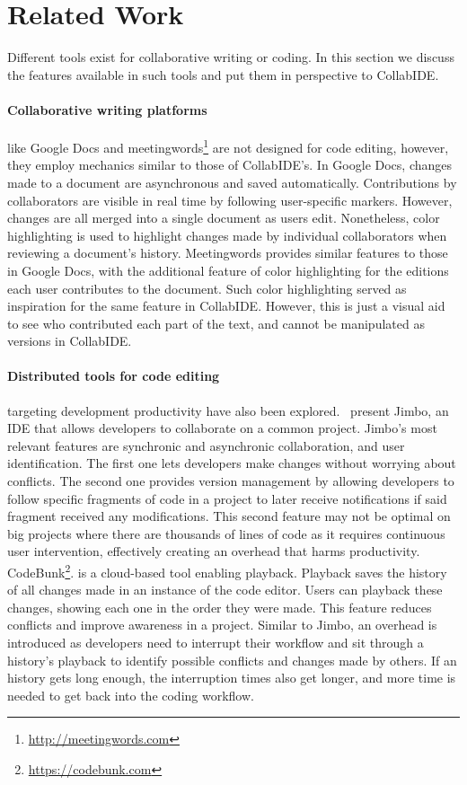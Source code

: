 

\section{Related Work}
\label{sec:related}

Different tools exist for collaborative writing or coding.
In this section we discuss the features available in such tools and put them in perspective to CollabIDE.

\paragraph
{Collaborative writing platforms} like Google Docs and 
meetingwords\footnote{\url{http://meetingwords.com}} are not designed for code editing, 
however, they employ mechanics similar to those of CollabIDE’s. In Google Docs, changes made to a 
document are asynchronous and saved automatically. Contributions by collaborators are visible in real 
time by following user-specific markers. However,  changes are all merged into a single document as 
users edit. Nonetheless, color highlighting is used to highlight changes made by individual collaborators 
when reviewing a document’s history. Meetingwords provides similar features to those in Google Docs, 
with the additional feature of color highlighting for the editions each user contributes to the document. 
Such color highlighting served as inspiration for the same feature in CollabIDE. However, this is just a 
visual aid to see who contributed each part of the text, and cannot be manipulated as versions in 
CollabIDE.

\paragraph
{Distributed tools for code editing} targeting development productivity have also been 
explored.~\citet{ghorashi} present Jimbo, an IDE that allows developers to collaborate on a common 
project. Jimbo's most relevant features are synchronic and asynchronic collaboration, and user 
identification. The first one lets developers make changes without worrying about conflicts. The second 
one provides version management by allowing developers to follow specific fragments of code in a 
project to later receive notifications if said fragment received any modifications. This second feature may 
not be optimal on big projects where there are thousands of lines of code as it requires continuous user 
intervention, effectively creating an overhead that harms productivity. 
CodeBunk\footnote{\url{https://codebunk.com}}. is a cloud-based tool enabling playback. Playback 
saves the history of all changes made in an instance of the code editor. Users can playback these 
changes, showing each one in the order they were made. This feature reduces conflicts and improve 
awareness in a project. Similar to Jimbo, an overhead is introduced as developers need to interrupt 
their workflow and sit through a history’s playback to identify possible conflicts and changes made by 
others. If an history gets long enough, the interruption times also get longer, and more time is needed 
to get back into the coding workflow.

